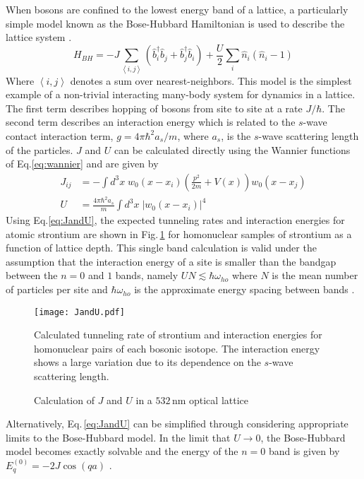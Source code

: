 When bosons are confined to the lowest energy band of a lattice, a particularly simple model known as the Bose-Hubbard Hamiltonian is used to describe the lattice system \cite{jbc98}. 
	\begin{equation} \label{eq:boseHubbard}
		 H_{BH} = -J \sum_{\left< i,j \right>} \left(\hat{b}^{\dagger}_i \hat{b}_j + \hat{b}^{\dagger}_j \hat{b}_i \right)
		 		  + \frac{U}{2} \sum_i \hat{n}_i(\hat{n}_i - 1)
	\end{equation}
Where $\left< i,j \right>$ denotes a sum over nearest-neighbors. This model is the simplest example of a non-trivial interacting many-body system for dynamics in a lattice.
The first term describes hopping of bosons from site to site at a rate $J/ \hbar$. 
The second term describes an interaction energy which is related to the $s$-wave contact interaction term, $g = 4 \pi \hbar^2 a_s/m$, where $a_s$, is the $s$-wave scattering length of the particles. 
$J$ and $U$ can be calculated directly using the Wannier functions of Eq.\;\ref{eq:wannier} and are given by \cite{Jaksch2005}
	\begin{equation} \label{eq:JandU}
	\begin{aligned}
		 J_{ij} &= - \int d^3x \; w_0(x-x_i) \left( \frac{p^2}{2m}+V(x) \right) w_0(x-x_j)\\
		 U &= \frac{4 \pi \hbar^2 a_s}{m} \int d^3x \; \left| w_0(x-x_i)\right|^4
	\end{aligned}
	\end{equation}
Using Eq.\;\ref{eq:JandU}, the expected tunneling rates and interaction energies for atomic strontium are shown in Fig.\,\ref{fig:fig_JandU} for homonuclear samples of strontium as a function of lattice depth. 
This single band calculation is valid under the assumption that the interaction energy of a site is smaller than the bandgap between the $n= 0$ and $1$ bands, namely $U N \lesssim \hbar \omega_{ho}$ where $N$ is the mean number of particles per site and $\hbar \omega_{ho}$ is the approximate energy spacing between bands \cite{Rey2004}. 
	\begin{figure}
		\centerline{
		\texttt{[image: JandU.pdf]}}
		\caption{Calculation of $J$ and $U$ in a $532$\,nm optical lattice}{Calculated tunneling rate of strontium and interaction energies for homonuclear pairs of each bosonic isotope. The interaction energy shows a large variation due to its dependence on the $s$-wave scattering length.}
		\label{fig:fig_JandU}
	\end{figure}
Alternatively, Eq.\,\ref{eq:JandU} can be simplified through considering appropriate limits to the Bose-Hubbard model. In the limit that $U\!\rightarrow\!0$, the Bose-Hubbard model becomes exactly solvable and the energy of the $n=0$ band is given by $E_q^{(0)}=-2J \cos(q a)$ \cite{Jaksch2005}.
